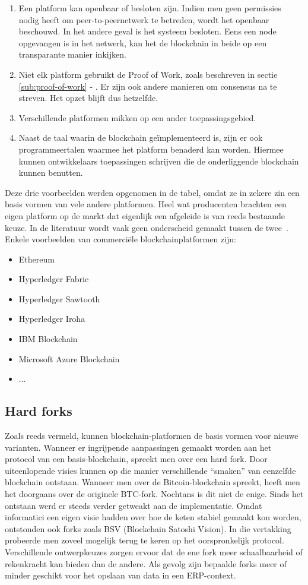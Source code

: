\begin{enumerate}
	\item Een platform kan openbaar of besloten zijn. Indien men geen permissies nodig heeft om peer-to-peernetwerk te betreden, wordt het openbaar beschouwd. In het andere geval is het systeem besloten. Eens een node opgevangen is in het netwerk, kan het de blockchain in beide op een transparante manier inkijken.
	\item Niet elk platform gebruikt de Proof of Work, zoals beschreven in sectie \ref{sub:proof-of-work} - . Er zijn ook andere manieren om consensus na te streven. Het opzet blijft dus hetzelfde.
	\item Verschillende platformen mikken op een ander toepassingsgebied.
	\item Naast de taal waarin de blockchain geïmplementeerd is, zijn er ook programmeertalen waarmee het platform benaderd kan worden. Hiermee kunnen ontwikkelaars toepassingen schrijven die de onderliggende blockchain kunnen benutten. 
\end{enumerate}
	
Deze drie voorbeelden werden opgenomen in de tabel, omdat ze in zekere zin een basis vormen van vele andere platformen. Heel wat producenten brachten een eigen platform op de markt dat eigenlijk een afgeleide is van reeds bestaande keuze. In de literatuur wordt vaak geen onderscheid gemaakt tussen de twee~\autocite{Gartner2022}. Enkele voorbeelden van commerciële blockchainplatformen zijn:
\begin{itemize}
	\item Ethereum
	\item Hyperledger Fabric
	\item Hyperledger Sawtooth
	\item Hyperledger Iroha
	\item IBM Blockchain
	\item Microsoft Azure Blockchain
	\item ...
\end{itemize}

\subsection{Hard forks}

Zoals reeds vermeld, kunnen blockchain-platformen de basis vormen voor nieuwe varianten. Wanneer er ingrijpende aanpassingen gemaakt worden aan het protocol van een basis-blockchain, spreekt men over een hard fork. Door uiteenlopende visies kunnen op die manier verschillende ``smaken'' van eenzelfde blockchain ontstaan. Wanneer men over de Bitcoin-blockchain spreekt, heeft men het doorgaans over de originele BTC-fork. Nochtans is dit niet de enige. Sinds het ontstaan werd er steeds verder getweakt aan de implementatie. Omdat informatici een eigen visie hadden over hoe de keten stabiel gemaakt kon worden, ontstonden ook forks zoals BSV (Blockchain Satoshi Vision). In die vertakking probeerde men zoveel mogelijk terug te keren op het oorspronkelijk protocol. Verschillende ontwerpkeuzes zorgen ervoor dat de ene fork meer schaalbaarheid of rekenkracht kan bieden dan de andere. Als gevolg zijn bepaalde forks meer of minder geschikt voor het opslaan van data in een ERP-context.

